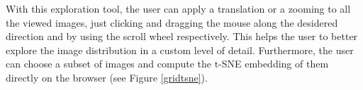 
With this exploration tool, the user can apply a translation or a zooming to all the viewed images, just clicking and dragging the mouse along the desidered direction and by using the scroll wheel respectively. This helps the user to better explore the image distribution in a custom level of detail.
Furthermore, the user can choose a subset of images and compute the t-SNE embedding of them directly on the browser (see Figure \ref{gridtsne}).%

